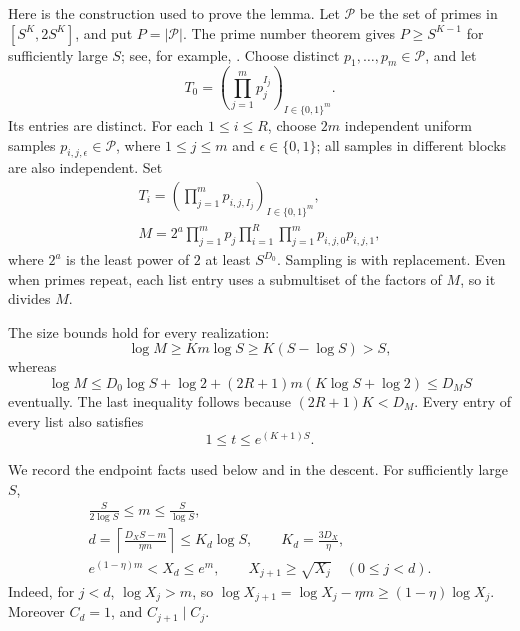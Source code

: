 Here is the construction used to prove the lemma.
Let \(\mathcal P\) be the set of primes in \([S^K,2S^K]\), and put
\(P=|\mathcal P|\).  The prime number theorem gives
\(P\ge S^{K-1}\) for sufficiently large \(S\); see, for example,
\cite[p.~305, (1.1)]{Selberg1949}.
Choose distinct \(p_1,\ldots,p_m\in\mathcal P\),
and let
\[
 T_0=\left(\prod_{j=1}^m p_j^{I_j}\right)_{I\in\{0,1\}^m}.
\]
Its entries are distinct.  For each \(1\le i\le R\), choose
\(2m\) independent uniform samples
\(p_{i,j,\epsilon}\in\mathcal P\), where
\(1\le j\le m\) and \(\epsilon\in\{0,1\}\); all samples in different
blocks are also independent.  Set
\[
 \begin{gathered}
 T_i=\left(\prod_{j=1}^m p_{i,j,I_j}\right)_{I\in\{0,1\}^m},\\
 M=2^a\prod_{j=1}^m p_j
       \prod_{i=1}^R\prod_{j=1}^m p_{i,j,0}p_{i,j,1},
 \end{gathered}
\]
where \(2^a\) is the least power of \(2\) at least \(S^{D_0}\).
Sampling is with replacement.  Even when primes repeat, each list
entry uses a submultiset of the factors of \(M\), so it divides \(M\).

The size bounds hold for every realization:
\[
 \log M\ge Km\log S\ge K(S-\log S)>S,
\]
whereas
\[
 \log M
 \le D_0\log S+\log2+(2R+1)m(K\log S+\log2)
 \le D_MS
\]
eventually.  The last inequality follows because
\((2R+1)K<D_M\).  Every entry of every list also satisfies
\begin{equation}\label{eq:product-size}
 1\le t\le e^{(K+1)S}.
\end{equation}

We record the endpoint facts used below and in the descent.
For sufficiently large \(S\),
\begin{equation}\label{eq:level-endpoints}
 \begin{gathered}
 \frac{S}{2\log S}\le m\le\frac S{\log S},\\
 d=\left\lceil\frac{D_XS-m}{\eta m}\right\rceil
       \le K_d\log S,\qquad K_d=\frac{3D_X}{\eta},\\
 e^{(1-\eta)m}<X_d\le e^m,\qquad
 X_{j+1}\ge\sqrt{X_j}\quad(0\le j<d).
 \end{gathered}
\end{equation}
Indeed, for \(j<d\), \(\log X_j>m\), so
\(\log X_{j+1}=\log X_j-\eta m\ge(1-\eta)\log X_j\).
Moreover \(C_d=1\), and \(C_{j+1}\mid C_j\).

